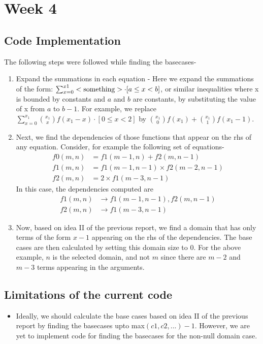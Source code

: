 \documentclass[12pt]{report}
\begin{document}
    \chapter*{Week 4}

    \section*{Code Implementation}
    The following steps were followed while finding the basecases-
    \begin{enumerate}
        \item Expand the summations in each equation - Here we expand the summations of the form: $\sum_{x=0}^{x1}<\textnormal{something}> \cdot [a \le x < b]$, or similar inequalities where x is bounded by constants and $a$ and $b$ are constants, by substituting the value of x from $a$ to $b-1$.
        For example, we replace $\sum_{x=0}^{x_1} {{x_1}\choose{x}} f(x_1-x)\cdot[0 \le x < 2]$ by ${{x_1}\choose{0}}f(x_1) + {{x_1}\choose{1}}f(x_1-1)$.
        \item Next, we find the dependencies of those functions that appear on the rhs of any equation. Consider, for example the following set of equations-
        \begin{align}
            f0(m, n) &= f1(m-1, n) + f2(m, n-1)\\
            f1(m, n) &= f1(m-1, n-1) \times f2(m-2, n-1)\\
            f2(m, n) &= 2 \times f1(m-3, n-1)
        \end{align}
        In this case, the dependencies computed are 
        \begin{align*}
            f1(m, n) &\rightarrow f1(m-1, n-1), f2(m, n-1)\\
            f2(m, n) &\rightarrow f1(m-3, n-1) 
        \end{align*}
        \item Now, based on idea II of the previous report, we find a domain that has only terms of the form $x-1$ appearing on the rhs of the dependencies. The base cases are then calculated by setting this domain size to 0. For the above example, $n$ is the selected domain, and not $m$ since there are $m-2$ and $m-3$ terms appearing in the arguments.
    \end{enumerate}
    \section*{Limitations of the current code}
    \begin{itemize}
        \item Ideally, we should calculate the base cases based on idea II of the previous report by finding the basecases upto max$(c1, c2, ...) - 1$. However, we are yet to implement code for finding the basecases for the non-null domain case.
    \end{itemize}
\end{document}
